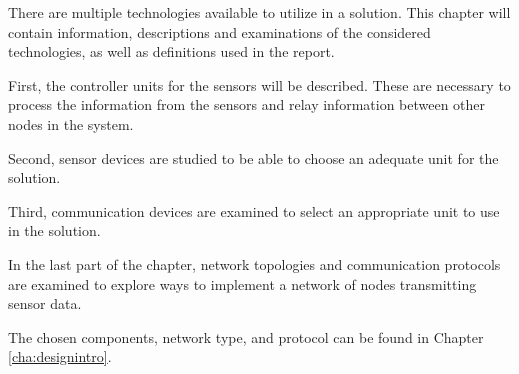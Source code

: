 \label{cha:technologies}
There are multiple technologies available to utilize in a solution. This chapter will contain information, descriptions and examinations of the considered technologies, as well as definitions used in the report.

First, the controller units for the sensors will be described. These are necessary to process the information from the sensors and relay information between other nodes in the system.

Second, sensor devices are studied to be able to choose an adequate unit for the solution.

Third, communication devices are examined to select an appropriate unit to use in the solution. 

In the last part of the chapter, network topologies and communication protocols are examined to explore ways to implement a network of nodes transmitting sensor data.

The chosen components, network type, and protocol can be found in Chapter \ref{cha:designintro}.










